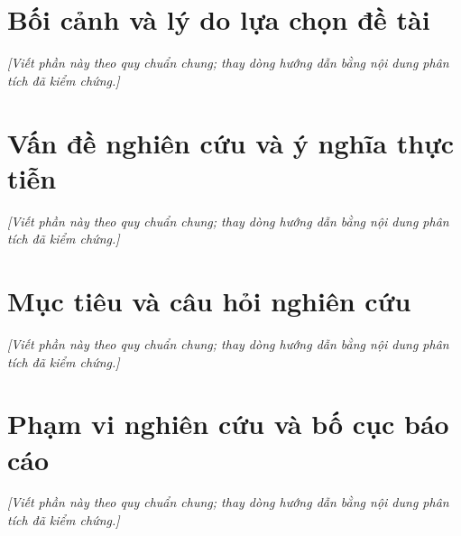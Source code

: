 \section{Bối cảnh và lý do lựa chọn đề tài}
\noindent\textit{[Viết phần này theo quy chuẩn chung; thay dòng hướng dẫn bằng nội dung phân tích đã kiểm chứng.]}

\section{Vấn đề nghiên cứu và ý nghĩa thực tiễn}
\noindent\textit{[Viết phần này theo quy chuẩn chung; thay dòng hướng dẫn bằng nội dung phân tích đã kiểm chứng.]}

\section{Mục tiêu và câu hỏi nghiên cứu}
\noindent\textit{[Viết phần này theo quy chuẩn chung; thay dòng hướng dẫn bằng nội dung phân tích đã kiểm chứng.]}

\section{Phạm vi nghiên cứu và bố cục báo cáo}
\noindent\textit{[Viết phần này theo quy chuẩn chung; thay dòng hướng dẫn bằng nội dung phân tích đã kiểm chứng.]}

